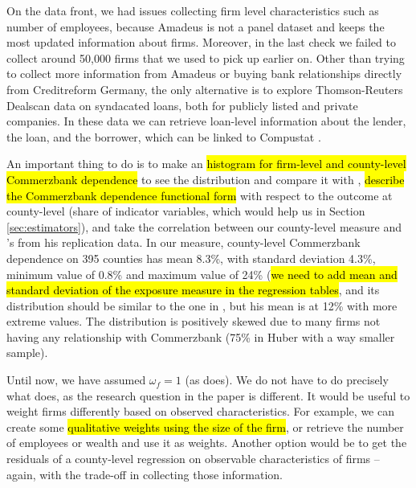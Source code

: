 \documentclass[11pt]{article}
\begin{document}
On the data front, we had issues collecting firm level characteristics such as number of employees, because Amadeus is not a panel dataset and keeps the most updated information about firms. Moreover, in the last check we failed to collect around 50,000 firms that we used to pick up earlier on. Other than trying to collect more information from Amadeus or buying bank relationships directly from Creditreform Germany, the only alternative is to explore Thomson-Reuters Dealscan data on syndacated loans, both for publicly listed and private companies. In these data we can retrieve loan-level information about the lender, the loan, and the borrower, which can be linked to Compustat \citep[see][for more information]{bib:chodorow-reich2014}.

An important thing to do is to make an \hl{histogram for firm-level and county-level Commerzbank dependence} to see the distribution and compare it with \citet{bib:huber2018}, \hl{describe the Commerzbank dependence functional form} with respect to the outcome at county-level (share of indicator variables, which would help us in Section \ref{sec:estimators}), and take the correlation between our county-level measure and \citet{bib:huber2018}'s from his replication data. In our measure, county-level Commerzbank dependence on 395 counties has mean 8.3\%, with standard deviation 4.3\%, minimum value of 0.8\% and maximum value of 24\% (\hl{we need to add mean and standard deviation of the exposure measure in the regression tables}, and its distribution should be similar to the one in \citet{bib:huber2018}, but his mean is at 12\% with more extreme values. The distribution is positively skewed due to many firms not having any relationship with Commerzbank (75\% in Huber with a way smaller sample). 

Until now, we have assumed $\omega_{f} = 1$ (as \citet{bib:huber2018} does). We do not have to do precisely what \citet{bib:huber2018} does, as the research question in the paper is different. It would be useful to weight firms differently based on observed characteristics. For example, we can create some \hl{qualitative weights using the size of the firm}, or retrieve the number of employees or wealth and use it as weights. Another option would be to get the residuals of a county-level regression on observable characteristics of firms -- again, with the trade-off in collecting those information.
\end{document}
